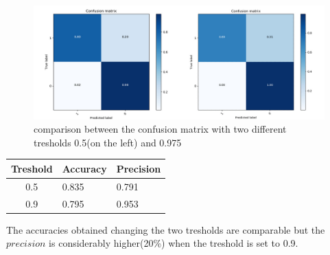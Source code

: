 \begin{figure}
\begin{center}
\includegraphics[width=1\linewidth]{images/FINAL MERGED.jpg}
\end{center}
   \caption{comparison between the confusion matrix with two different tresholds 0.5(on the left) and 0.975}
\label{fig:conf_matrices}
\end{figure}


\begin{table}[]
\centering
\begin{tabular}{|c|ll|}
\hline
Treshold & Accuracy & Precision \\ \hline
0.5                          & 0.835    & 0.791     \\ \hline
0.9                          & 0.795    & 0.953     \\ \hline
\end{tabular}
\end{table}


The accuracies obtained changing the two tresholds are comparable but the $precision$ is considerably higher(20\%) when the treshold is set to 0.9.



